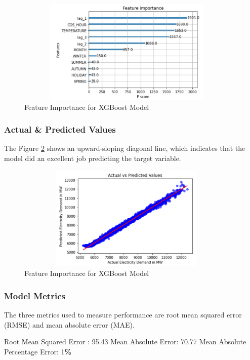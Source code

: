 \documentclass[mstat,12pt]{unswthesis}
\newenvironment{Shaded}{\begin{snugshade}}{\end{snugshade}}
\newcommand{\DecValTok}[1]{\textcolor[rgb]{0.00,0.00,0.81}{#1}}
\newcommand{\FloatTok}[1]{\textcolor[rgb]{0.00,0.00,0.81}{#1}}
\newcommand{\NormalTok}[1]{#1}
\newcommand{\OperatorTok}[1]{\textcolor[rgb]{0.81,0.36,0.00}{\textbf{#1}}}
\begin{document}
\begin{figure}[H]
\centering
\includegraphics[width=0.95\textwidth, height=5cm]{featureimp.png}
\caption{Feature Importance for XGBoost Model}\label{featureimp}
\end{figure}

\subsubsection{Actual \& Predicted
Values}\label{actual-predicted-values}

The Figure \ref{actualpredict} shows an upward-sloping diagonal line,
which indicates that the model did an excellent job predicting the
target variable.

\begin{figure}[H]
\centering
\includegraphics[width=0.95\textwidth, height=5cm]{actualpredict.png}
\caption{Feature Importance for XGBoost Model}\label{actualpredict}
\end{figure}

\subsubsection{Model Metrics}\label{model-metrics}

The three metrics used to measure performance are root mean squared
error (RMSE) and mean absolute error (MAE).

\begin{Shaded}
\begin{Highlighting}[]
\NormalTok{Root Mean Squared Error : }\FloatTok{95.43}
\NormalTok{Mean Absolute Error: }\FloatTok{70.77}
\NormalTok{Mean Absolute Percentage Error: }\DecValTok{1}\OperatorTok{\%}
\end{Highlighting}
\end{Shaded}
\end{document}
